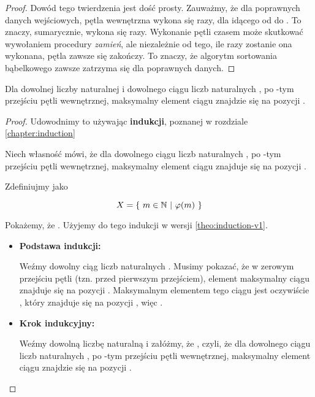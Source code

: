 \begin{example}
\begin{proof}
Dowód tego twierdzenia jest dość prosty. Zauważmy, że dla poprawnych danych wejściowych, pętla wewnętrzna wykona się  razy, dla  idącego od  do . To znaczy, sumarycznie, wykona się  razy. Wykonanie pętli czasem może skutkować wywołaniem procedury \textit{zamień}, ale niezależnie od tego, ile razy zostanie ona wykonana, pętla zawsze się zakończy. To znaczy, że algorytm sortowania bąbelkowego zawsze zatrzyma się dla poprawnych danych.
\end{proof}

\begin{theo}
\label{theo:invariant_inner_loop}
Dla dowolnej liczby naturalnej  i dowolnego ciągu liczb naturalnych , po -tym przejściu pętli wewnętrznej, maksymalny element ciągu  znajdzie się na pozycji .
\end{theo}

\begin{proof}
Udowodnimy to używając \textbf{indukcji}, poznanej w rozdziale \ref{chapter:induction}

Niech własność  mówi, że dla dowolnego ciągu liczb naturalnych , po -tym przejściu pętli wewnętrznej, maksymalny element ciągu  znajduje się na pozycji .

Zdefiniujmy  jako

\[
    X = \{\ m \in \mathbb{N}\ |\ \varphi(m)\ \}
\]

Pokażemy, że . Użyjemy do tego indukcji w wersji \ref{theo:induction-v1}.

\begin{itemize}
    \item \textbf{Podstawa indukcji:}
    
    Weźmy dowolny ciąg liczb naturalnych . Musimy pokazać, że w zerowym przejściu pętli (tzn. przed pierwszym przejściem), element maksymalny ciągu  znajduje się na pozycji . Maksymalnym elementem tego ciągu jest oczywiście , który znajduje się na pozycji , więc .
    
    \item \textbf{Krok indukcyjny:}
    
    Weźmy dowolną liczbę naturalną  i załóżmy, że , czyli, że dla dowolnego ciągu liczb naturalnych , po -tym przejściu pętli wewnętrznej, maksymalny element ciągu  znajdzie się na pozycji .
    

\end{itemize}
\end{proof}
\end{example}
